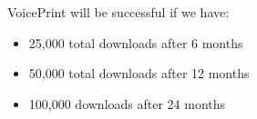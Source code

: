 VoicePrint will be successful if we have:
\begin{itemize}
    \item 25,000 total downloads after 6 months
    \item 50,000 total downloads after 12 months
    \item 100,000 downloads after 24 months
\end{itemize}